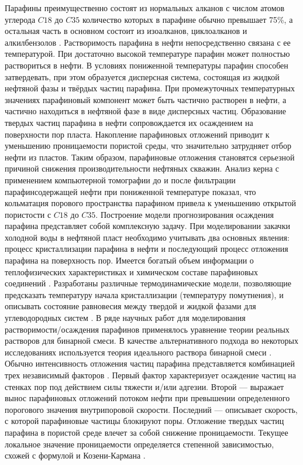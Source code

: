 \documentclass[12pt,twoside,a4paper]{uz_ku}
\begin{document}
	Парафины преимущественно состоят из нормальных алканов с числом атомов углерода $C18$ до $C35$ количество которых в парафине обычно превышает 75\%, а остальная часть в основном состоит из изоалканов, циклоалканов и алкилбензолов \cite{2}. Растворимость парафина в нефти непосредственно связана с ее температурой. При достаточно высокой температуре парафин может полностью раствориться в нефти. В условиях пониженной температуры парафин способен затвердевать, при этом образуется дисперсная система, состоящая из жидкой нефтяной фазы и твёрдых частиц парафина. При промежуточных температурных значениях парафиновый компонент может быть частично растворен в нефти, а частично находиться в нефтяной фазе в виде дисперсных частиц. Образование твердых частиц парафина в нефти сопровождается их осаждением на поверхности пор пласта. Накопление парафиновых отложений приводит к уменьшению проницаемости пористой среды, что значительно затрудняет отбор нефти из пластов.  Таким образом, парафиновые отложения становятся серьезной причиной снижения производительности нефтяных скважин. Анализ керна с применением компьютерной томографии до и после фильтрации парафинсодержащей нефти при пониженной температуре \cite{3} показал, что кольматация порового пространства парафином привела к уменьшению открытой пористости с $C18$ до $C35$. Построение модели прогнозирования осаждения парафина представляет собой комплексную задачу. При моделировании закачки холодной воды в нефтяной пласт необходимо учитывать два основных явления: процесс кристаллизации парафина в нефти и последующий процесс отложения парафина на поверхность пор. Имеется богатый объем информации о теплофизических характеристиках и химическом составе парафиновых соединений \cite{4}. Разработаны различные термодинамические модели, позволяющие предсказать температуру начала кристаллизации (температуру помутнения), и описывать состояние равновесия между твердой и жидкой фазами для углеводородных систем \cite{2, 5, 6}. В ряде научных работ для моделирования растворимости/осаждения парафинов применялось уравнение теории реальных растворов для бинарной смеси. В качестве альтернативного подхода во некоторых исследованиях используется теория идеального раствора бинарной смеси \cite{7, 8}. Обычно интенсивность отложения частиц парафина представляется комбинацией трех независимый факторов \cite{4, 5, 6, 9}. Первый фактор характеризует осаждение частиц на стенках пор под действием силы тяжести и/или адгезии. Второй — выражает вынос парафиновых отложений потоком нефти при превышении определенного порогового значения внутрипоровой скорости. Последний — описывает скорость, с которой парафиновые частицы блокируют поры. Отложение твердых частиц парафина в пористой среде влечет за собой снижение проницаемости. Текущее локальное значение проницаемости определяется степенной зависимостью, схожей с формулой и Козени-Кармана \cite{10}.
\end{document}
